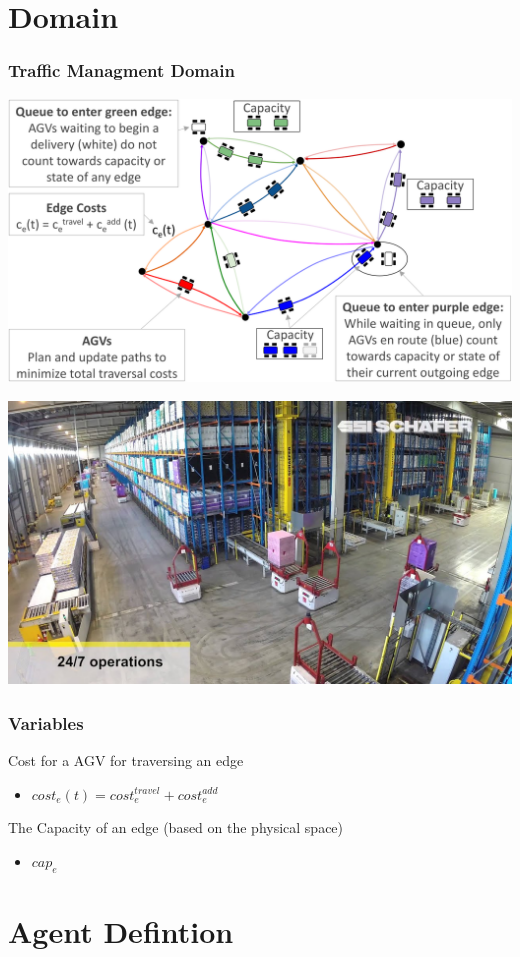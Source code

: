 \documentclass{beamer}
\begin{document}
	\section{Domain}
	\begin{frame}
		\frametitle{Traffic Managment Domain}
		\includegraphics[width=\textwidth]{enviroment.png}
	\end{frame}
	\begin{frame}
		\includegraphics[width=\textwidth]{warehouse.jpg}
	\end{frame}
	\begin{frame}
		\frametitle{Variables}
		Cost for a AGV for traversing an edge
		\begin{itemize}
			\item $cost_e(t) = cost_e^{travel} + cost_e^{add}$
		\end{itemize}
		The Capacity of an edge (based on the physical space)
		\begin{itemize}
			\item $cap_e$
		\end{itemize}
	\end{frame}

	\section{Agent Defintion}
	\begin{frame}

	\end{frame}
\end{document}
